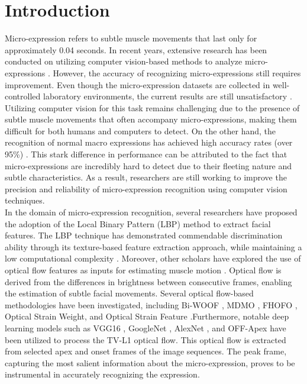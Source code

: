 \documentclass[review,12pt, 3p]{elsarticle}
\begin{document}
\section{Introduction}
Micro-expression refers to subtle muscle movements that last only for approximately 0.04 seconds. In recent years, extensive research has been conducted on utilizing computer vision-based methods to analyze micro-expressions \cite{ref-47}. However, the accuracy of recognizing micro-expressions still requires improvement. Even though the micro-expression datasets are collected in well-controlled laboratory environments, the current results are still unsatisfactory \cite{ref-9}. Utilizing computer vision for this task remains challenging due to the presence of subtle muscle movements that often accompany micro-expressions, making them difficult for both humans and computers to detect. On the other hand, the recognition of normal macro expressions has achieved high accuracy rates (over 95\%) \cite{ref-4}. This stark difference in performance can be attributed to the fact that micro-expressions are incredibly hard to detect due to their fleeting nature and subtle characteristics. As a result, researchers are still working to improve the precision and reliability of micro-expression recognition using computer vision techniques.\\
In the domain of micro-expression recognition, several researchers have proposed the adoption of the Local Binary Pattern (LBP) method to extract facial features. The LBP technique has demonstrated commendable discrimination ability through its texture-based feature extraction approach, while maintaining a low computational complexity \cite{ref-8}. Moreover, other scholars have explored the use of optical flow features as inputs for estimating muscle motion \cite{ref-8}. Optical flow is derived from the differences in brightness between consecutive frames, enabling the estimation of subtle facial movements. Several optical flow-based methodologies have been investigated, including Bi-WOOF \cite{ref-24}, MDMO \cite{ref-26}, FHOFO \cite{ref-25}, Optical Strain Weight, and Optical Strain Feature \cite{ref-27}.Furthermore, notable deep learning models such as VGG16 \cite{ref-14}, GoogleNet \cite{ref-13}, AlexNet \cite{ref-11}, and OFF-Apex \cite{ref-9} have been utilized to process the TV-L1 optical flow. This optical flow is extracted from selected apex and onset frames of the image sequences. The peak frame, capturing the most salient information about the micro-expression, proves to be instrumental in accurately recognizing the expression.\\
\end{document}
